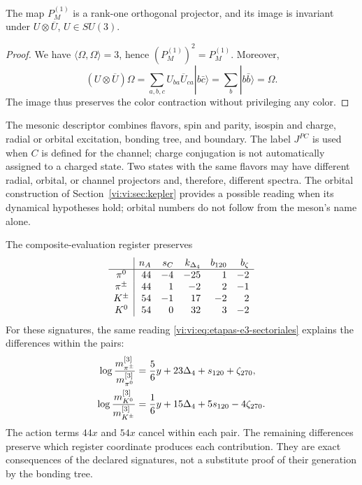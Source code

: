 \begin{proposition}
The map \(P_M^{(1)}\) is a rank-one orthogonal projector, and
its image is invariant under \(U\otimes\overline U\), \(U\in SU(3)\).
\end{proposition}
\begin{proof}
We have \(\langle\Omega,\Omega\rangle=3\), hence
\((P_M^{(1)})^2=P_M^{(1)}\). Moreover,
\[
 (U\otimes\overline U)\Omega
 =\sum_{a,b,c}U_{ba}\overline U_{ca}|b\bar c\rangle
 =\sum_b|b\bar b\rangle=\Omega.
\]
The image thus preserves the color contraction without privileging any color.
\end{proof}

The mesonic descriptor combines flavors, spin and parity, isospin and charge,
radial or orbital excitation, bonding tree, and boundary. The label
\(J^{PC}\) is used when \(C\) is defined for the channel; charge
conjugation is not automatically assigned to a charged state. Two
states with the same flavors may have different radial,
orbital, or channel projectors and, therefore, different spectra. The
orbital construction of Section~\ref{vi:vi:sec:kepler} provides a
possible reading when its dynamical hypotheses hold; orbital
numbers do not follow from the meson's name alone.

The composite-evaluation register preserves
\[
\begin{array}{c|r r r r r}
 &n_A&s_C&k_{\Delta_4}&b_{120}&b_\zeta\\\hline
 \pi^0&44&-4&-25&1&-2\\
 \pi^\pm&44&1&-2&2&-1\\
 K^\pm&54&-1&17&-2&2\\
 K^0&54&0&32&3&-2
\end{array}
\]
For these signatures, the same reading \eqref{vi:vi:eq:etapas-e3-sectoriales}
explains the differences within the pairs:
\begin{align}
 \log\frac{m_{\pi^\pm}^{[3]}}{m_{\pi^0}^{[3]}}
 &=\frac56y+23\Delta_4+s_{120}+\zeta_{270},\notag\\
 \log\frac{m_{K^0}^{[3]}}{m_{K^\pm}^{[3]}}
 &=\frac16y+15\Delta_4+5s_{120}-4\zeta_{270}.
 \label{vi:vi:eq:desdoblamientos-mesonicos}
\end{align}
The action terms \(44x\) and \(54x\) cancel within
each pair. The remaining differences preserve which register coordinate
produces each contribution. They are exact consequences of the
declared signatures, not a substitute proof of their generation by the
bonding tree.

